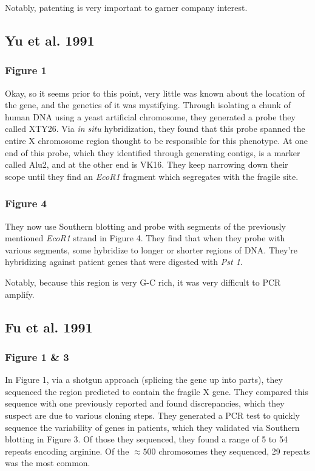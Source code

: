 Notably, patenting is very important to garner company interest. 


\subsection*{Yu et al. 1991}

\subsubsection*{Figure 1}

Okay, so it seems prior to this point, very little was known about the location of the gene, and the genetics of it was mystifying. Through isolating a chunk of human DNA using a yeast artificial chromosome, they generated a probe they called XTY26. Via \textit{in situ} hybridization, they found that this probe spanned the entire X chromosome region thought to be responsible for this phenotype. At one end of this probe, which they identified through generating contigs, is a marker called Alu2, and at the other end is VK16. They keep narrowing down their scope until they find an \textit{EcoR1} fragment which segregates with the fragile site. 

\subsubsection*{Figure 4}

They now use Southern blotting and probe with segments of the previously mentioned \textit{EcoR1} strand in Figure 4. They find that when they probe with various segments, some hybridize to longer or shorter regions of DNA. They're hybridizing against patient genes that were digested with \textit{Pst 1}.\newline

Notably, because this region is very G-C rich, it was very difficult to PCR amplify. 


\subsection*{Fu et al. 1991}

\subsubsection*{Figure 1 \& 3}

In Figure 1, via a shotgun approach (splicing the gene up into parts), they sequenced the region predicted to contain the fragile X gene. They compared this sequence with one previously reported and found discrepancies, which they suspect are due to various cloning steps. They generated a PCR test to quickly sequence the variability of genes in patients, which they validated via Southern blotting in Figure 3. Of those they sequenced, they found a range of 5 to 54 repeats encoding arginine. Of the $\approx 500$ chromosomes they sequenced, 29 repeats was the most common. 


